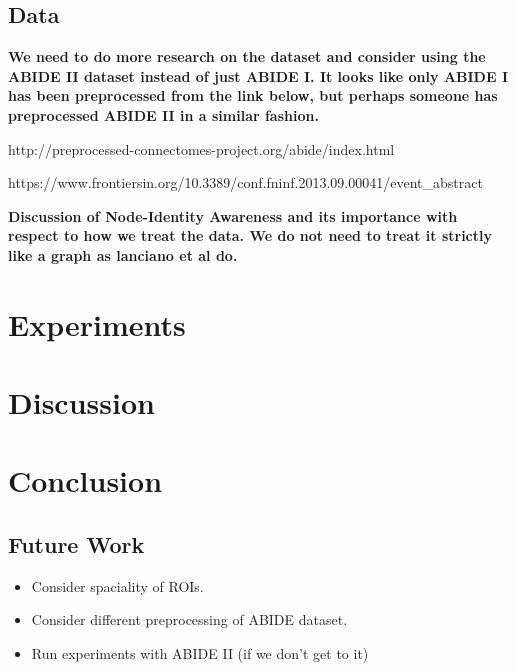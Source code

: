 \documentclass[letterpaper]{article}
\begin{document}
\subsection{Data}
\textbf{We need to do more research on the dataset and consider using the ABIDE II dataset instead of just ABIDE I. It looks like only ABIDE I has been preprocessed from the link below, but perhaps someone has preprocessed ABIDE II in a similar fashion.}

http://preprocessed-connectomes-project.org/abide/index.html

https://www.frontiersin.org/10.3389/conf.fninf.2013.09.00041/event\_abstract



\textbf{Discussion of Node-Identity Awareness and its importance with respect to how we treat the data. We do not need to treat it strictly like a graph as lanciano et al do.}

\section{Experiments}

\section{Discussion}

\section{Conclusion}

\subsection{Future Work}
\begin{itemize}
    \item Consider spaciality of ROIs.
    \item Consider different preprocessing of ABIDE dataset.
    \item Run experiments with ABIDE II (if we don't get to it)
\end{itemize}

\appendix


\end{document}
